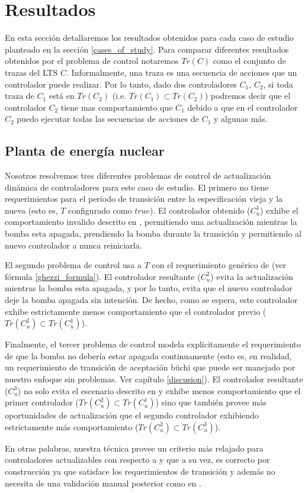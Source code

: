 \section{Resultados}

En esta sección detallaremos los resultados obtenidos para cada caso de estudio planteado en la sección
\ref{cases_of_study}. Para comparar diferentes resultados obtenidos por el problema de control notaremos $Tr(C)$ como el
conjunto de trazas del LTS $C$. Informalmente, una traza es una secuencia de acciones que un controlador puede
realizar. Por lo tanto, dado dos controladores $C_1$, $C_2$, si toda traza de $C_1$ está en $Tr(C_2)$ (i.e. $Tr(C_1) \subset
Tr(C_2)$) podremos decir que el controlador $C_2$ tiene mas comportamiento que $C_1$ debido a que en el controlador
$C_2$ puedo ejecutar todas las secuencias de acciones de $C_1$ y algunas más.

\subsection{Planta de energía nuclear}

Nosotros resolvemos tres diferentes problemas de control de actualización dinámica de controladores para este caso de
estudio. El primero no tiene requerimientos para el período de transición entre la especificación vieja y la nueva (esto
es, $T$ configurado como $true$). El controlador obtenido ($C^1_u$) exhibe el comportamiento invalido descrito en
\cite{PanzicaLaManna:2013:FCC:2487336.2487349}, permitiendo una actualización mientras la bomba esta apagada, prendiendo
la bomba durante la transición y permitiendo al nuevo controlador a nunca reiniciarla.

El segundo problema de control usa a $T$ con el requerimiento genérico de \cite{6224401} (ver fórmula
\ref{ghezzi_formula}). El controlador resultante ($C^2_u$) evita la actualización mientras la bomba esta apagada, y por
lo
tanto, evita que el nuevo controlador deje la bomba apagada sin intención. De hecho, como se espera, este controlador
exhibe estrictamente menos comportamiento que el controlador previo ($Tr(C^2_u) \subset Tr(C^1_u)$).

Finalmente, el tercer problema de control modela explícitamente el requerimiento de que la bomba no debería estar
apagada continuamente (esto es, en realidad, un requerimiento de transición de aceptación büchi que puede ser manejado
por nuestro enfoque sin problemas. Ver capítulo \ref{discusion}). El controlador resultante ($C^3_u$) no solo evita el
escenario descrito en \cite{PanzicaLaManna:2013:FCC:2487336.2487349} y exhibe menos comportamiento que el primer
controlador ($Tr(C^2_u) \subset Tr(C^1_u)$) sino que también provee más oportunidades de actualización que el segundo
controlador exhibiendo estrictamente más comportamiento ($Tr(C^2_u) \subset Tr(C^3_u)$). 

En otras palabras, nuestra técnica provee un criterio más relajado para controladores actualizables con respecto a
\cite{6224401} y que a su vez, es correcto por construcción ya que satisface los requerimientos de transición y además
no necesita de una validación manual posterior como en \cite{PanzicaLaManna:2013:FCC:2487336.2487349}.

